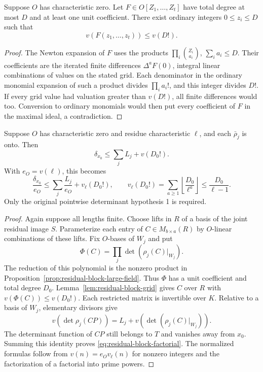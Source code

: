 \begin{lemma}
\label{lem:residual-block-grid}
Suppose $O$ has characteristic zero. Let
$F\in O[Z_1,\ldots,Z_t]$ have total degree at most $D$ and
at least one unit coefficient. There exist ordinary integers
$0\le z_i\le D$ such that
\[
                            v(F(z_1,\ldots,z_t))\le v(D!).
\]
\end{lemma}
\begin{proof}
The Newton expansion of $F$ uses the products
$\prod_i\binom{Z_i}{a_i}$, $\sum_i a_i\le D$.
Their coefficients are the iterated finite differences
$\Delta^aF(0)$, integral linear combinations of values on the stated
grid. Each denominator in the ordinary monomial expansion of such
a product divides $\prod_i a_i!$, and this integer divides $D!$.
If every grid value had valuation greater than $v(D!)$, all finite
differences would too. Conversion to ordinary monomials would then
put every coefficient of $F$ in the maximal ideal, a contradiction.
\end{proof}

\begin{theorem}
\label{thm:residual-block-factorial}
Suppose $O$ has characteristic zero and residue characteristic
$\ell$, and each $\bar\rho_j$ is onto. Then
\begin{equation}\label{eq:residual-block-factorial}
                   \delta_{x_0}\le\sum_jL_j+v(D_0!).
\end{equation}
With $e_O=v(\ell)$, this becomes
\[
 \frac{\delta_{x_0}}{e_O}
       \le\sum_j\frac{L_j}{e_O}+v_\ell(D_0!),
 \qquad
 v_\ell(D_0!)=\sum_{a\ge1}\left\lfloor\frac{D_0}{\ell^a}\right\rfloor
       \le\frac{D_0}{\ell-1}.
\]
Only the original pointwise determinant hypothesis 1 is required.
\end{theorem}
\begin{proof}
Again suppose all lengths finite. Choose lifts in $R$ of a basis
of the joint residual image $S$. Parameterize each entry of
$C\in M_{b\times a}(R)$ by $O$-linear combinations of these lifts.
Fix $O$-bases of $W_j$ and put
\[
                 \Phi(C)=\prod_j\det(\rho_j(C)|_{W_j}).
\]
The reduction of this polynomial is the nonzero product in
Proposition~\ref{prop:residual-block-large-field}. Thus $\Phi$ has
a unit coefficient and total degree $D_0$.
Lemma~\ref{lem:residual-block-grid} gives $C$ over $R$ with
$v(\Phi(C))\le v(D_0!)$. Each restricted matrix is invertible over
$K$. Relative to a basis of $W_j$, elementary divisors give
\[
 v(\det\rho_j(CP))
 =L_j+v(\det(\rho_j(C)|_{W_j})).
\]
The determinant function of $CP$ still belongs to $T$ and
vanishes away from $x_0$. Summing this identity proves
\eqref{eq:residual-block-factorial}. The normalized formulas follow
from $v(n)=e_Ov_\ell(n)$ for nonzero integers and the factorization
of a factorial into prime powers.
\end{proof}

